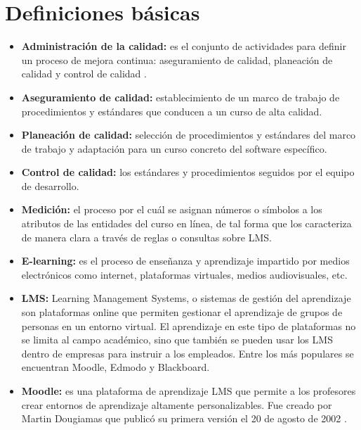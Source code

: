 

\section{Definiciones básicas}

\begin{itemize}
	\item \textbf{Administración de la calidad:} es el conjunto de actividades para definir un proceso de mejora continua: aseguramiento de calidad, planeación de calidad y control de calidad \cite{dolado2000medicion} \cite{Sommerville10}.
	\item \textbf{Aseguramiento de calidad:} establecimiento de un marco de trabajo de procedimientos y estándares que conducen a un curso de alta calidad.
	\item \textbf{Planeación de calidad:} selección de procedimientos y estándares del
	marco de trabajo y adaptación para un curso concreto del software específico.
	\item \textbf{Control de calidad:} los estándares y procedimientos seguidos por el
	equipo de desarrollo.
	
	\item \textbf{Medición:} el proceso por el cuál se asignan números o símbolos a los atributos de las entidades del
	curso en línea, de tal forma que los caracteriza de manera clara a través de reglas o consultas sobre LMS.
	
	\item \textbf{E-learning:}
	es el proceso de enseñanza y aprendizaje impartido por medios electrónicos como internet, plataformas virtuales, medios audiovisuales, etc.
	\item \textbf{LMS:}
	Learning Management Systems, o sistemas de gestión del aprendizaje son plataformas online que permiten gestionar el aprendizaje de grupos de personas en un entorno virtual. El aprendizaje en este tipo de plataformas no se limita al campo académico, sino que también se pueden usar los LMS dentro de empresas para instruir a los empleados. Entre los más populares se encuentran Moodle, Edmodo y Blackboard.
	\item \textbf{Moodle:}
	es una plataforma de aprendizaje LMS que permite a los profesores crear entornos de aprendizaje altamente personalizables. Fue creado por Martin Dougiamas que publicó su primera versión el 20 de agosto de 2002 \cite{dougiamas2002interpretive}.
\end{itemize}


